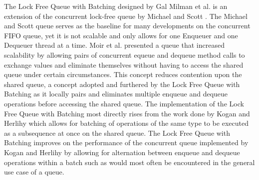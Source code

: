 The Lock Free Queue with Batching designed by Gal Milman et al. \parencite{r1} is an extension of the concurrent lock-free queue by Michael and Scott \parencite{r2}. The Michael and Scott queue serves as the baseline for many developments on the concurrent FIFO queue, yet it is not scalable and only allows for one Enqueuer and one Dequeuer thread at a time. Moir et al. \parencite{r3} presented a queue that increased scalability by allowing pairs of concurrent equeue and dequeue method calls to exchange values and eliminate themselves without having to access the shared queue under certain circumstances. This concept reduces contention upon the shared queue, a concept adopted and furthered by the Lock Free Queue with Batching as it locally pairs and eliminates multiple enqueue and dequeue operations before accessing the shared queue. The implementation of the Lock Free Queue with Batching most directly rises from the work done by Kogan and Herlihy which allows for batching of operations of the same type to be executed as a subsequence at once on the shared queue. The Lock Free Queue with Batching improves on the performance of the concurrent queue implemented by Kogan and Herlihy by allowing for alternation between enqueue and dequeue operations within a batch such as would most often be encountered in the general use case of a queue.
